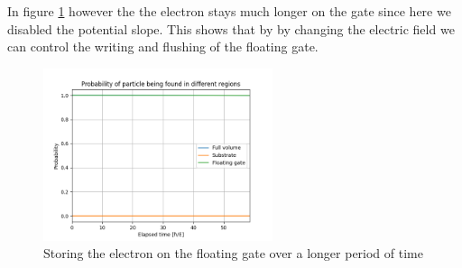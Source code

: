 In figure \ref{fig:flash_keep} however the the electron stays much longer on the gate since here we disabled the potential slope.
This shows that by by changing the electric field we can control the writing and flushing of the floating gate.
\begin{figure}
	\centering
	\includegraphics[width=0.6\textwidth]{figures/flash_keep.png}
	\caption{Storing the electron on the floating gate over a longer period of time}
	\label{fig:flash_keep}
\end{figure}






